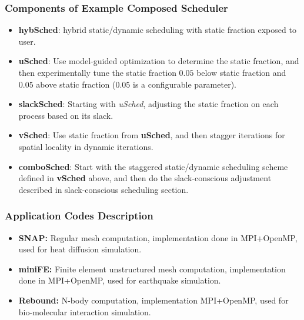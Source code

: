 {\begin{frame}[label=combinedSched]
\frametitle{Components of Example Composed Scheduler}
\begin{itemize}
\small \item \small \textbf{hybSched}: hybrid static/dynamic scheduling
with static fraction exposed to user.\\
\item \small \textbf{uSched}: Use model-guided optimization to
  determine the static fraction,  and then experimentally tune the
  static fraction $0.05$ below static fraction and $0.05$ above static
  fraction ($0.05$ is a configurable parameter).
\item \small \textbf{slackSched}: Starting with \textit{uSched},
adjusting the static fraction on each process based on its slack.
\item \small \textbf{vSched}: Use static fraction from \textbf{uSched},
  and then stagger iterations for spatial locality in dynamic
  iterations.
\item \small \textbf{comboSched}: Start with the staggered static/dynamic scheduling scheme defined in \textbf{vSched} above, and then do the slack-conscious adjustment described in slack-conscious scheduling section.
\end{itemize}
\end{frame}

\begin{frame}[label=appsAndExpSetup]
\frametitle{Application Codes Description}
\begin{itemize}
\small \item \small {\bf SNAP:} Regular mesh computation, 
implementation done in MPI+OpenMP, used for heat diffusion simulation.
\item \small {\bf miniFE:} Finite element unstructured mesh computation, implementation done in MPI+OpenMP, used for earthquake simulation. 
\item \small {\bf Rebound:} N-body computation, implementation
  MPI+OpenMP, used for bio-molecular interaction simulation.
\end{itemize} 
\end{frame} 

}
